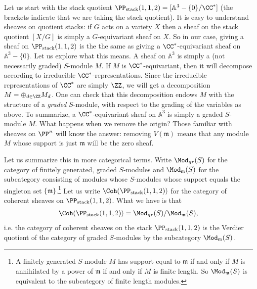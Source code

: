 Let us start with the stack quotient $\PP_{\text{stack}}(1,1,2) = [\mathbb A^3 - \{0\} / \CC^*]$ (the brackets indicate that we are taking the stack quotient).  It is easy to understand sheaves on quotient stacks: if $G$ acts on a variety $X$ then a sheaf on the stack quotient $[X/G]$ is simply a $G$-equivariant sheaf on $X$.  So in our case, giving a sheaf on $\PP_{\text{stack}}(1,1,2) $ is the the same as giving a $\CC^*$-equivariant sheaf on $\mathbb A^3 - \{0\}$.  Let us explore what this means.  A sheaf on $\mathbb A^3$ is simply a (not necessarily graded) $S$-module $M$.  If $M$ is $\CC^*$-equivariant, then it will decompose according to irreducible $\CC^*$-representations. Since the irreducible representations of $\CC^*$ are simply $\ZZ$, we will get a decomposition $M=\oplus_{d\in \ZZ} M_d$.   One can check that this decomposition endows $M$ with the structure of a {\em graded} $S$-module, with respect to the grading of the variables as above.  To summarize, a $\CC^*$-equivariant sheaf on $\mathbb A^3$ is simply a graded $S$-module $M$.  What happens when we remove the origin?  Those familiar with sheaves on $\PP^n$ will know the answer:  removing $V(\mathfrak m)$ means that any module $M$ whose support is just $\mathfrak m$ will be the zero sheaf.

Let us summarize this in more categorical terms.  Write $\Mod_{gr}(S)$ for the category of finitely generated, graded $S$-modules and $\Mod_{\mathfrak m}(S)$ for the subcategory consisting of modules whose $S$-modules whose support equals the singleton set $\{\mathfrak m\}$.\footnote{A finitely generated $S$-module $M$ has support equal to $\mathfrak m$ if and only if $M$ is annihilated by a power of $\mathfrak m$ if and only if $M$ is finite length.  So $\Mod_{\mathfrak m}(S)$ is equivalent to the subcategory of finite length modules.} Let us write $\Coh(\PP_{\text{stack}}(1,1,2) )$ for the category of coherent sheaves on $\PP_{\text{stack}}(1,1,2)$.  What we have is that
\[
\Coh(\PP_{\text{stack}}(1,1,2) ) = \Mod_{gr}(S) / \Mod_{\mathfrak m}(S),
\]
i.e. the category of coherent sheaves on the stack $\PP_{\text{stack}}(1,1,2)$ is the Verdier quotient of the category of graded $S$-modules by the subcategory  $\Mod_{\mathfrak m}(S)$.

